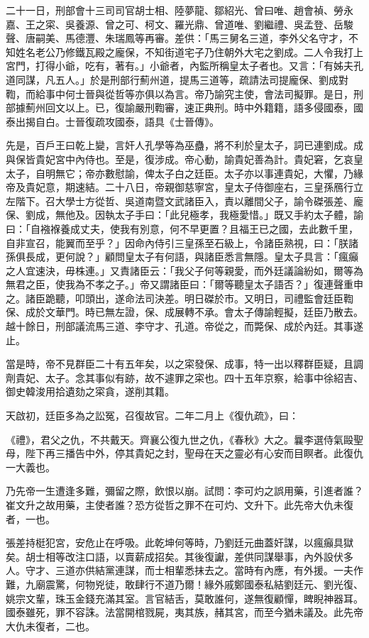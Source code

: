 \begin{pinyinscope}
二十一日，刑部會十三司司官胡士相、陸夢龍、鄒紹光、曾曰唯、趙會禎、勞永嘉、王之寀、吳養源、曾之可、柯文、羅光鼎、曾道唯、劉繼禮、吳孟登、岳駿聲、唐嗣美、馬德灃、朱瑞鳳等再審。差供：「馬三舅名三道，李外父名守才，不知姓名老公乃修鐵瓦殿之龐保，不知街道宅子乃住朝外大宅之劉成。二人令我打上宮門，打得小爺，吃有，著有。」小爺者，內監所稱皇太子者也。又言：「有姊夫孔道同謀，凡五人。」於是刑部行薊州道，提馬三道等，疏請法司提龐保、劉成對鞫，而給事中何士晉與從哲等亦俱以為言。帝乃諭究主使，會法司擬罪。是日，刑部據薊州回文以上。已，復諭嚴刑鞫審，速正典刑。時中外籍籍，語多侵國泰，國泰出揭自白。士晉復疏攻國泰，語具《士晉傳》。

先是，百戶王曰乾上變，言奸人孔學等為巫蠱，將不利於皇太子，詞已連劉成。成與保皆貴妃宮中內侍也。至是，復涉成。帝心動，諭貴妃善為計。貴妃窘，乞哀皇太子，自明無它；帝亦數慰諭，俾太子白之廷臣。太子亦以事連貴妃，大懼，乃緣帝及貴妃意，期速結。二十八日，帝親御慈寧宮，皇太子侍御座右，三皇孫鴈行立左階下。召大學士方從哲、吳道南暨文武諸臣入，責以離間父子，諭令磔張差、龐保、劉成，無他及。因執太子手曰：「此兒極孝，我極愛惜。」既又手約太子體，諭曰：「自襁褓養成丈夫，使我有別意，何不早更置？且福王已之國，去此數千里，自非宣召，能翼而至乎？」因命內侍引三皇孫至石級上，令諸臣熟視，曰：「朕諸孫俱長成，更何說？」顧問皇太子有何語，與諸臣悉言無隱。皇太子具言：「瘋癲之人宜速決，毋株連。」又責諸臣云：「我父子何等親愛，而外廷議論紛如，爾等為無君之臣，使我為不孝之子。」帝又謂諸臣曰：「爾等聽皇太子語否？」復連聲重申之。諸臣跪聽，叩頭出，遂命法司決差。明日磔於市。又明日，司禮監會廷臣鞫保、成於文華門。時已無左證，保、成展轉不承。會太子傳諭輕擬，廷臣乃散去。越十餘日，刑部議流馬三道、李守才、孔道。帝從之，而斃保、成於內廷。其事遂止。

當是時，帝不見群臣二十有五年矣，以之寀發保、成事，特一出以釋群臣疑，且調劑貴妃、太子。念其事似有跡，故不遽罪之寀也。四十五年京察，給事中徐紹吉、御史韓浚用拾遺劾之寀貪，遂削其籍。

天啟初，廷臣多為之訟冤，召復故官。二年二月上《復仇疏》，曰：

《禮》，君父之仇，不共戴天。齊襄公復九世之仇，《春秋》大之。曩李選侍氣毆聖母，陛下再三播告中外，停其貴妃之封，聖母在天之靈必有心安而目瞑者。此復仇一大義也。

乃先帝一生遭逢多難，彌留之際，飲恨以崩。試問：李可灼之誤用藥，引進者誰？崔文升之故用藥，主使者誰？恐方從哲之罪不在可灼、文升下。此先帝大仇未復者，一也。

張差持梃犯宮，安危止在呼吸。此乾坤何等時，乃劉廷元曲蓋奸謀，以瘋癲具獄矣。胡士相等改注口語，以賣薪成招矣。其後復讞，差供同謀舉事，內外設伏多人。守才、三道亦供結黨連謀，而士相輩悉抹去之。當時有內應，有外援。一夫作難，九廟震驚，何物兇徒，敢肆行不道乃爾！緣外戚鄭國泰私結劉廷元、劉光復、姚宗文輩，珠玉金錢充滿其室。言官結舌，莫敢誰何，遂無復顧憚，睥睨神器耳。國泰雖死，罪不容誅。法當開棺戮屍，夷其族，赭其宮，而至今猶未議及。此先帝大仇未復者，二也。


\end{pinyinscope}
